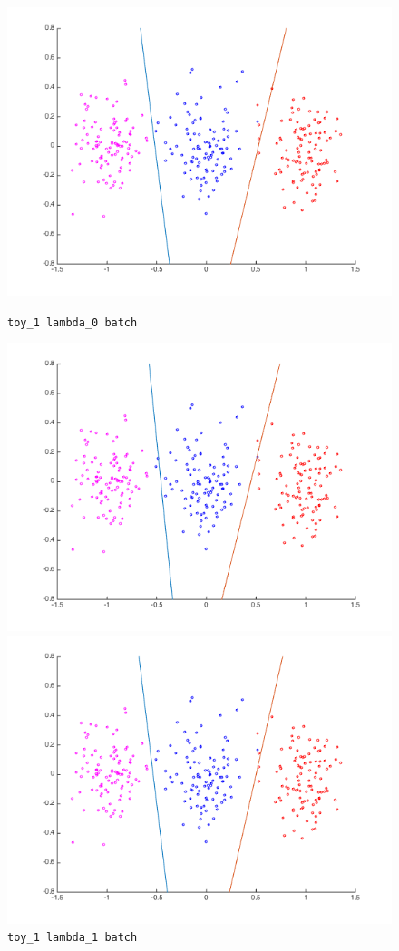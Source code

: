 \documentclass[11pt,letterpaper]{article}
\begin{document}
\begin{figure}[!htb]
  \includegraphics[width=\linewidth]{figures/batch_lambda0_toy.png}
  \caption{\texttt{toy\_1 lambda\_0 batch}}\label{fig:gradDifQ}
\endminipage\hfill
{}
  \includegraphics[width=\linewidth]{figures/batch_lambda1_toy.png}
  \caption{\texttt{toy\_1 lambda\_1 batch}}\label{fig:gradDifN}
\endminipage\hfill
{}
  \includegraphics[width=\linewidth]{figures/sgd_lambda0_toy.png}

\end{figure}
\end{document}
